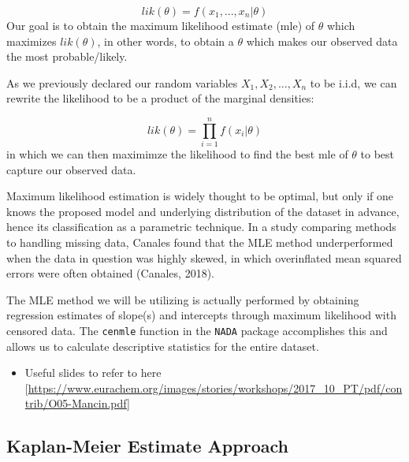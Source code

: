 \documentclass[12pt, twoside]{amherstthesis}
\providecommand{\tightlist}{%
  \setlength{\itemsep}{0pt}\setlength{\parskip}{0pt}}
\begin{document}
\[lik(\theta) = f(x_1,...,x_n|\theta)\]
Our goal is to obtain the maximum likelihood estimate (mle) of \(\theta\) which maximizes \(lik(\theta)\), in other words, to obtain a \(\theta\) which makes our observed data the most probable/likely.

As we previously declared our random variables \(X_1, X_2,...,X_n\) to be i.i.d, we can rewrite the likelihood to be a product of the marginal densities:

\[lik(\theta) = \prod_{i=1}^{n} f(x_i|\theta)\]
in which we can then maximimze the likelihood to find the best mle of \(\theta\) to best capture our observed data.

Maximum likelihood estimation is widely thought to be optimal, but only if one knows the proposed model and underlying distribution of the dataset in advance, hence its classification as a parametric technique. In a study comparing methods to handling missing data, Canales found that the MLE method underperformed when the data in question was highly skewed, in which overinflated mean squared errors were often obtained (Canales, 2018).

The MLE method we will be utilizing is actually performed by obtaining regression estimates of slope(s) and intercepts through maximum likelihood with censored data. The \texttt{cenmle} function in the \texttt{NADA} package accomplishes this and allows us to calculate descriptive statistics for the entire dataset.
\begin{itemize}
\tightlist
\item
  Useful slides to refer to here {[}\url{https://www.eurachem.org/images/stories/workshops/2017_10_PT/pdf/contrib/O05-Mancin.pdf}{]}
\end{itemize}
\hypertarget{Kaplan-Meier}{%
\subsection{Kaplan-Meier Estimate Approach}\label{Kaplan-Meier}}
\end{document}
